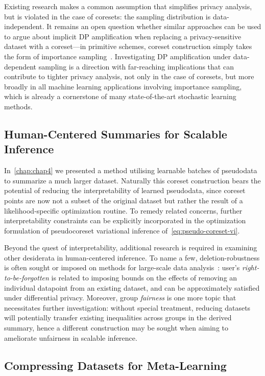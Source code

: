 Existing research makes a common assumption that simplifies privacy analysis, but is violated in the case of coresets: the sampling distribution is data-independent. It remains an open question whether similar approaches can be used to argue about implicit DP amplification when replacing a privacy-sensitive dataset with a coreset---in primitive schemes, coreset construction simply takes the form of importance sampling~\citep{bachem17}. Investigating DP amplification under data-dependent sampling is a direction with far-reaching implications that can contribute to tighter privacy analysis, not only in the case of coresets, but more broadly in all machine learning applications involving importance sampling, which is already a cornerstone of many state-of-the-art stochastic learning methods. 


\subsection{Human-Centered Summaries for Scalable Inference}
\label{subsec:human-oriented-pseudodata}

In~\cref{chap:chap4} we presented a method utilising learnable batches of pseudodata to summarize a much larger dataset. Naturally this coreset construction bears the potential of reducing the interpretability of learned pseudodata, since coreset points are now not a subset of the original dataset but rather the result of a likelihood-specific optimization routine. To remedy related concerns, further interpretability constraints can be explicitly incorporated in the optimization formulation of pseudocoreset variational inference of~\cref{eq:pseudo-coreset-vi}.

Beyond the quest of interpretability, additional research is required in examining other desiderata in human-centered inference. To name a few, deletion-robustness is often sought or imposed on methods for large-scale data analysis~\citep{mirzasoleiman17, ginart19}: user's \emph{right-to-be-forgotten} is related to imposing bounds on the effects of removing an individual datapoint from an existing dataset, and can be approximately satisfied under differential privacy. Moreover, group \emph{fairness} is one more topic that necessitates further investigation: without special treatment, reducing datasets will potentially transfer existing inequalities across groups in the derived summary, hence a different construction may be sought when aiming to ameliorate unfairness in scalable inference.  

\subsection{Compressing Datasets for Meta-Learning}
\label{subsec:metacoresets}

